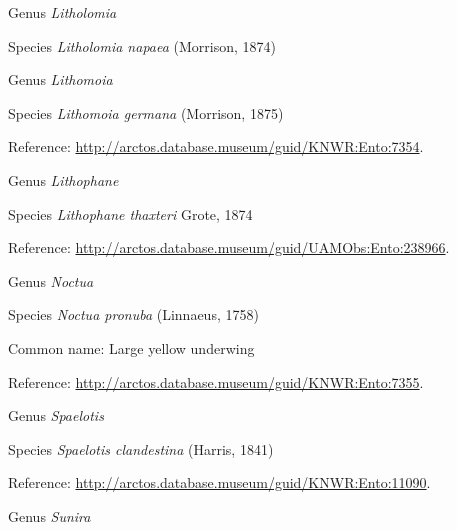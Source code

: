\documentclass[9pt, article]{memoir}
\begin{document}
\begin{multicols}{2}
\vspace{6pt}\noindent\hspace{30pt}Genus \textit{Litholomia}


\vspace{6pt}\noindent\hspace{36pt}Species \textit{Litholomia napaea} (Morrison, 1874)


\vspace{6pt}\noindent\hspace{30pt}Genus \textit{Lithomoia}


\vspace{6pt}\noindent\hspace{36pt}Species \textit{Lithomoia germana} (Morrison, 1875)


Reference: 
\url{http://arctos.database.museum/guid/KNWR:Ento:7354}.

\vspace{6pt}\noindent\hspace{30pt}Genus \textit{Lithophane}


\vspace{6pt}\noindent\hspace{36pt}Species \textit{Lithophane thaxteri} Grote, 1874


Reference: 
\url{http://arctos.database.museum/guid/UAMObs:Ento:238966}.

\vspace{6pt}\noindent\hspace{30pt}Genus \textit{Noctua}


\vspace{6pt}\noindent\hspace{36pt}Species \textit{Noctua pronuba} (Linnaeus, 1758)


Common name: Large yellow underwing

Reference: 
\url{http://arctos.database.museum/guid/KNWR:Ento:7355}.

\vspace{6pt}\noindent\hspace{30pt}Genus \textit{Spaelotis}


\vspace{6pt}\noindent\hspace{36pt}Species \textit{Spaelotis clandestina} (Harris, 1841)


Reference: 
\url{http://arctos.database.museum/guid/KNWR:Ento:11090}.

\vspace{6pt}\noindent\hspace{30pt}Genus \textit{Sunira}



\end{multicols}
\end{document}
